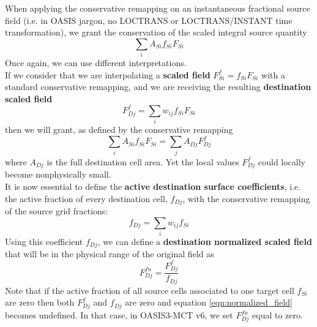 When applying the conservative remapping on an instantaneous fractional source field (i.e. in OASIS jargon, no LOCTRANS or LOCTRANS/INSTANT time transformation), we grant the conservation of the scaled integral source quantity
\[\sum_iA_{Si}f_{Si}F_{Si}\]
Once again, we can use different interpretations.\\
If we consider that we are interpolating a {\bf scaled field} \(F^f_{Si}=f_{Si}F_{Si}\) with a standard conservative remapping,  and we are receiving the resulting 
{\bf destination scaled field}
\begin{equation}\label{eqn:inst_scaled}
    F^f_{Dj} = \sum_iw_{ij}f_{Si}F_{Si}
\end{equation}
then we will grant, as defined by the conservative remapping
\[\sum_iA_{Si}f_{Si}F_{Si} = \sum_jA_{Dj}F^f_{Dj}\]
where \(A_{Dj}\) is the full destination cell area. Yet the local values \(F^f_{Dj}\) could locally become nonphysically small.\\
It is now essential to define the {\bf active destination surface coefficients}, i.e. the active fraction of every destination cell, \(f_{Dj}\), with the conservative remapping of the source grid fractions: 
\begin{equation}\label{eqn:inst_dest_fract}
f_{Dj} = \sum_i{w_{ij}f_{Si}}
\end{equation}
 Using this coefficient \(f_{Dj}\), we can define a {\bf destination normalized scaled field} that will be in the physical range of the original field as
\begin{equation}\label{eqn:normalized_field}
F^{fn}_{Dj} = \frac{F^f_{Dj}}{f_{Dj}}    
\end{equation}
Note that if the active fraction of all source cells associated to one target cell \(f_{Si}\) are zero then both \(F^{f}_{Dj}\) and \(f_{Dj}\) are zero and equation \ref{eqn:normalized_field} becomes undefined. In that case, in OASIS3-MCT v6, we set \(F^{fn}_{Dj}\) equal to zero.

